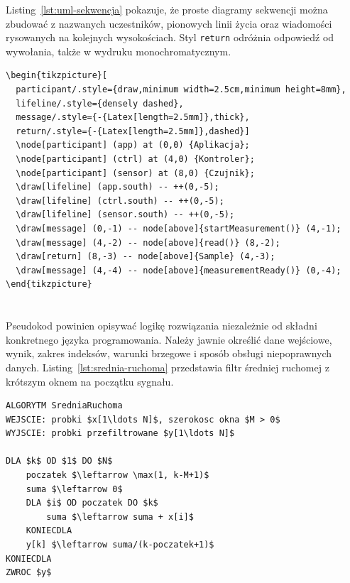 Listing~\ref{lst:uml-sekwencja} pokazuje, że proste diagramy sekwencji można zbudować
z nazwanych uczestników, pionowych linii życia oraz wiadomości rysowanych na kolejnych
wysokościach. Styl \texttt{return} odróżnia odpowiedź od wywołania, także w wydruku
monochromatycznym.

\begin{lstlisting}[style=thesis,caption={Kod prostego diagramu sekwencji},label={lst:uml-sekwencja}]
\begin{tikzpicture}[
  participant/.style={draw,minimum width=2.5cm,minimum height=8mm},
  lifeline/.style={densely dashed},
  message/.style={-{Latex[length=2.5mm]},thick},
  return/.style={-{Latex[length=2.5mm]},dashed}]
  \node[participant] (app) at (0,0) {Aplikacja};
  \node[participant] (ctrl) at (4,0) {Kontroler};
  \node[participant] (sensor) at (8,0) {Czujnik};
  \draw[lifeline] (app.south) -- ++(0,-5);
  \draw[lifeline] (ctrl.south) -- ++(0,-5);
  \draw[lifeline] (sensor.south) -- ++(0,-5);
  \draw[message] (0,-1) -- node[above]{startMeasurement()} (4,-1);
  \draw[message] (4,-2) -- node[above]{read()} (8,-2);
  \draw[return] (8,-3) -- node[above]{Sample} (4,-3);
  \draw[message] (4,-4) -- node[above]{measurementReady()} (0,-4);
\end{tikzpicture}
\end{lstlisting}

\section{}

Pseudokod powinien opisywać logikę rozwiązania niezależnie od składni konkretnego języka
programowania. Należy jawnie określić dane wejściowe, wynik, zakres indeksów, warunki
brzegowe i sposób obsługi niepoprawnych danych. Listing~\ref{lst:srednia-ruchoma}
przedstawia filtr średniej ruchomej z krótszym oknem na początku sygnału.

\begin{lstlisting}[style=thesis-pseudocode,caption={Pseudokod filtru średniej ruchomej},label={lst:srednia-ruchoma},mathescape=true]
ALGORYTM SredniaRuchoma
WEJSCIE: probki $x[1\ldots N]$, szerokosc okna $M > 0$
WYJSCIE: probki przefiltrowane $y[1\ldots N]$

DLA $k$ OD $1$ DO $N$
    poczatek $\leftarrow \max(1, k-M+1)$
    suma $\leftarrow 0$
    DLA $i$ OD poczatek DO $k$
        suma $\leftarrow suma + x[i]$
    KONIECDLA
    y[k] $\leftarrow suma/(k-poczatek+1)$
KONIECDLA
ZWROC $y$
\end{lstlisting}

